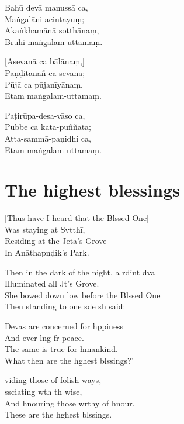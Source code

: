 Bahū devā manussā ca,\\
Maṅgalāni acintayuṃ;\\
Ākaṅkhamānā sotthānaṃ,\\
Brūhi maṅgalam-uttamaṃ.

[Asevanā ca bālānaṃ,]\\
Paṇḍitānañ-ca sevanā;\\
Pūjā ca pūjanīyānaṃ,\\
Etam maṅgalam-uttamaṃ.

Paṭirūpa-desa-vāso ca,\\
Pubbe ca kata-puññatā;\\
Atta-sammā-paṇidhi ca,\\
Etam maṅgalam-uttamaṃ.

\clearpage

\chapter{The highest blessings}%

\begin{leader}
\end{leader}

[Thus have I heard that the Blssed One]\\
Was staying at Svtthī,\\
Residing at the Jeta's Grove\\
In Anāthapṇḍik's Park.

Then in the dark of the night, a rdint dva\\
Illuminated all Jt's Grove.\\
She bowed down low before the Blssed One\\
Then standing to one sde sh said:

Devas are concerned for hppiness\\
And ever lng fr peace.\\
The same is true for hmankind.\\
What then are the hghest blssings?'

viding those of folish ways,\\
ssciating wth th wise,\\
And hnouring those wrthy of hnour.\\
These are the hghest blssings.

